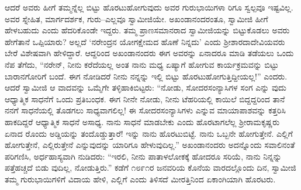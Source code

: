 ಆದರೆ ಅವರು ಹೀಗೆ ತಮ್ಮನ್ನೆಲ್ಲ ಬಿಟ್ಟು ಹೊರಟುಹೋಗುವುದು ಅವರ ಗುರುಭಾಯಿಗಳಾ ರಿಗೂ ಸ್ವಲ್ಪವೂ ಇಷ್ಟವಿಲ್ಲ. ಅವರ ಸ್ನೇಹಿತ, ಮಾರ್ಗದರ್ಶಕ, ಗುರು–ಎಲ್ಲವೂ ಸ್ವಾಮೀಜಿಯೇ. ಅಖಂಡಾನಂದರಂತೂ, ಸ್ವಾಮೀಜಿ ಹೀಗೆ ಹೇಳಬಹುದು ಎಂದು ಹೆದರಿಕೊಂಡೇ ಇದ್ದರು. ತಮ್ಮ ಪ್ರಾಣಸಮಾನರಾದ ಸ್ವಾಮೀಜಿಯನ್ನು ಬಿಟ್ಟುಕೊಡಲು ಅವರು ಹೇಗೆತಾನೆ ಒಪ್ಪಿಯಾರು? ಅಲ್ಲದೆ ‘ನರೇಂದ್ರನ ಯೋಗಕ್ಷೇಮದ ಹೊಣೆ ನಿನ್ನದು’ ಎಂದು ಶ್ರೀಶಾರದಾದೇವಿಯವರು ಬೇರೆ ವಿಶೇಷವಾಗಿ ಹೇಳಿದ್ದಾರೆ. ಆದ್ದರಿಂದ ಅಖಂಡಾನಂದರು ಈಗ ಅವರನ್ನು ಏನಾದರೂ ಮಾಡಿ ತಡೆಯಲು ಒಂದು ನೆಪ ತೆಗೆದು, “ನರೇನ್, ನೀನು ಕರೆದೆಯಲ್ಲ ಅಂತ ನಾನು ಮಧ್ಯ ಏಷ್ಯಾಗೆ ಹೋಗುವ ಕಾರ್ಯಕ್ರಮವನ್ನು ಬಿಟ್ಟು ಬಾರಾನಗೋರಿಗೆ ಬಂದೆ. ಈಗ ನೋಡಿದರೆ ನೀನು ನನ್ನನ್ನು ಇಲ್ಲಿ ಬಿಟ್ಟು ಹೊರಟುಹೋಗುತ್ತಿದ್ದೀಯಲ್ಲ!” ಎಂದರು. ಆದರೆ ಸ್ವಾಮೀಜಿ ಆ ವಾದವನ್ನು ಒಮ್ಮೆಗೇ ತಳ್ಳಿಹಾಕಿಬಿಟ್ಟರು: “ನೋಡು, ಸೋದರಸಂನ್ಯಾಸಿಗಳ ಸಂಗ ಎನ್ನು ವುದು ಆಧ್ಯಾತ್ಮಿಕ ಸಾಧನೆಗೆ ಒಂದು ಪ್ರತಿಬಂಧಕ. ಈಗ ನೀನೇ ನೋಡು, ನೀನು ಟೆಹರಿಯಲ್ಲಿ ಕಾಯಿಲೆ ಬಿದ್ದದ್ದರಿಂದ ತಾನೆ ನನಗೆ ಸಾಧನೆಯಲ್ಲಿ ತೊಡಗಲು ಸಾಧ್ಯವಾಗಲಿಲ್ಲ! ಈ ಸೋದರಸಂನ್ಯಾಸಿಗಳು ಎನ್ನುವ ಮಾಯಾಪಾಶವನ್ನು ಕತ್ತರಿಸಿ ಹಾಕದಿದ್ದರೆ ಆಧ್ಯಾತ್ಮಿಕ ಸಾಧನೆ ಅಸಾಧ್ಯ. ನಾನು ಸಾಧನೆ ಮಾಡಬೇಕು ಎಂದು ಹೊರಟಾಗಲೆಲ್ಲ ಶ್ರೀರಾಮಕೃಷ್ಣರು ಏನಾದ ರೊಂದು ಅಡ್ಡಿಯನ್ನು ತಂದೊಡ್ಡುತ್ತಾರೆ! ಇನ್ನು ನಾನು ಹೊರಟುಬಿಟ್ಟೆ. ನಾನು ಒಬ್ಬನೇ ಹೋಗುತ್ತೇನೆ. ಎಲ್ಲಿಗೆ ಹೋಗುತ್ತೇನೆ, ಎಲ್ಲಿರುತ್ತೇನೆ ಎನ್ನುವುದನ್ನು ಯಾರಿಗೂ ಹೇಳುವುದಿಲ್ಲ.” ಅಖಂಡಾನಂದರು ಅದನ್ನೊಂದು ಸವಾಲಿನಂತೆ ಪರಿಗಣಿಸಿ, ಅರ್ಧಹಾಸ್ಯವಾಗಿ ನುಡಿದರು: “ಇರಲಿ, ನೀನು ಪಾತಾಳಲೋಕಕ್ಕೆ ಹೋದರೂ ಸರಿಯೆ, ನಾನು ನಿನ್ನನ್ನು ಪತ್ತೆಹಚ್ಚದೆ ಬಿಡು ವುದಿಲ್ಲ, ನೋಡುತ್ತಿರು.” ಕಡೆಗೆ ೧೮೯೧ರ ಜನವರಿಯ ಕೊನೆಯ ವಾರದಲ್ಲೊಂದು ದಿನ, ಸ್ವಾಮೀಜಿ ತಮ್ಮ ಗುರುಭಾಯಿಗಳಿಗೆ ವಿದಾಯ ಹೇಳಿ, ಎಲ್ಲಿಗೆ ಎಂದು ತಿಳಿಸದೆ ಮೀರತ್ತಿನಿಂದ ಏಕಾಂಗಿಯಾಗಿ ಹೊರಟರು.

